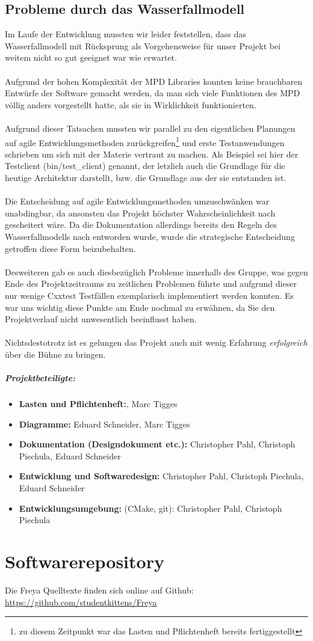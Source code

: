 \documentclass[11pt]{scrreprt}
\begin{document}
\section{Probleme durch das Wasserfallmodell}
Im Laufe der Entwicklung mussten wir leider feststellen, dass das Wasserfallmodell mit Rücksprung als Vorgehensweise für unser Projekt bei weitem nicht so gut geeignet war wie erwartet.
\\
\\
Aufgrund der hohen Komplexität der MPD Libraries konnten keine brauchbaren Entwürfe der 
Software gemacht werden, da man sich viele Funktionen des MPD völlig anders vorgestellt hatte, als sie in 
Wirklichkeit funktionierten. 
\\
\\
Aufgrund dieser Tatsachen mussten wir parallel zu den eigentlichen Planungen auf agile Entwicklungsmethoden zurückgreifen\footnote{zu diesem Zeitpunkt war das Lasten und Pflichtenheft bereits fertiggestellt} und erste Testanwendungen schrieben um sich mit der Materie vertraut zu machen.
Als Beispiel sei hier der Testclient (bin/test\_client) genannt, der letzlich auch die Grundlage für die heutige
Architektur darstellt, bzw. die Grundlage aus der sie entstanden ist.
\\
\\
Die Entscheidung auf agile Entwicklungsmethoden umzuschwänken war unabdingbar, da ansonsten das Projekt 
höchster Wahrscheinlichkeit nach gescheitert wäre. Da die Dokumentation allerdings bereits den Regeln des Wasserfallmodells nach entworden wurde,
wurde die strategische Entscheidung getroffen diese Form beizubehalten.
\\
\\
Desweiteren gab es auch diesbezüglich Probleme innerhalb des Gruppe, was gegen Ende des Projektzeitraums
zu zeitlichen Problemen führte und aufgrund dieser nur wenige Cxxtest Testfällen exemplarisch implementiert werden konnten.
Es war uns wichtig diese Punkte am Ende nochmal zu erwähnen, da Sie den Projektverlauf nicht unwesentlich beeinflusst haben.
\\
\\
Nichtsdestotrotz ist es gelungen das Projekt auch mit wenig Erfahrung \emph{erfolgreich} über die Bühne zu bringen. 

\paragraph{Projektbeteiligte:}
\begin{itemize}
\item \textbf{Lasten und Pflichtenheft:}, Marc Tigges
\item \textbf{Diagramme:} Eduard Schneider, Marc Tigges
\item \textbf{Dokumentation (Designdokument etc.):} Christopher Pahl, Christoph Piechula, Eduard Schneider
\item \textbf{Entwicklung und Softwaredesign:} Christopher Pahl, Christoph Piechula, Eduard Schneider
\item \textbf{Entwicklungsumgebung:} (CMake, git): Christopher Pahl, Christoph Piechula 
\end{itemize}

\chapter{Softwarerepository}
Die Freya Quelltexte finden sich online auf Github:
\\
\url{https://github.com/studentkittens/Freya}
\end{document}
